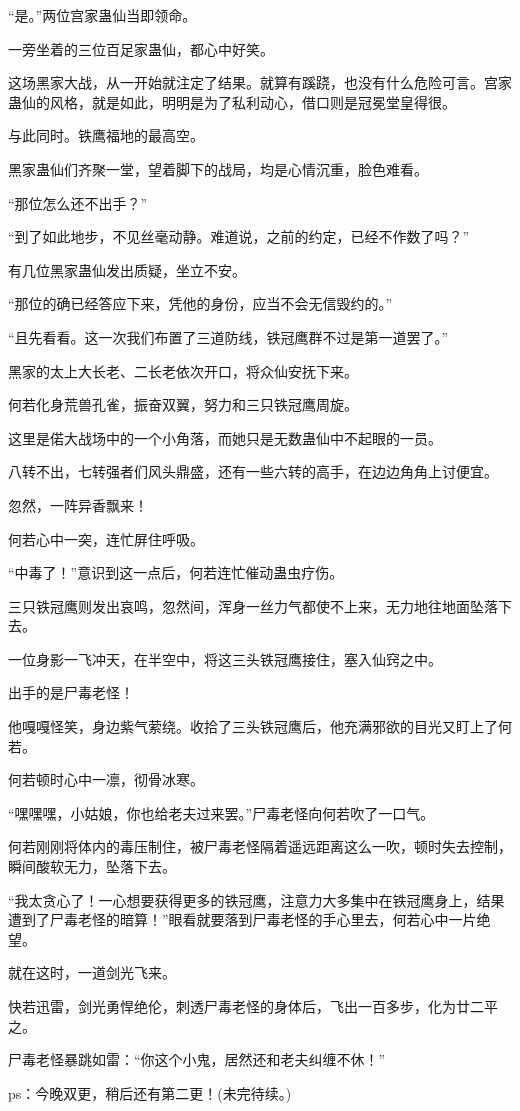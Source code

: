 \begin{this_body}
“是。”两位宫家蛊仙当即领命。

一旁坐着的三位百足家蛊仙，都心中好笑。

这场黑家大战，从一开始就注定了结果。就算有蹊跷，也没有什么危险可言。宫家蛊仙的风格，就是如此，明明是为了私利动心，借口则是冠冕堂皇得很。

与此同时。铁鹰福地的最高空。

黑家蛊仙们齐聚一堂，望着脚下的战局，均是心情沉重，脸色难看。

“那位怎么还不出手？”

“到了如此地步，不见丝毫动静。难道说，之前的约定，已经不作数了吗？”

有几位黑家蛊仙发出质疑，坐立不安。

“那位的确已经答应下来，凭他的身份，应当不会无信毁约的。”

“且先看看。这一次我们布置了三道防线，铁冠鹰群不过是第一道罢了。”

黑家的太上大长老、二长老依次开口，将众仙安抚下来。

何若化身荒兽孔雀，振奋双翼，努力和三只铁冠鹰周旋。

这里是偌大战场中的一个小角落，而她只是无数蛊仙中不起眼的一员。

八转不出，七转强者们风头鼎盛，还有一些六转的高手，在边边角角上讨便宜。

忽然，一阵异香飘来！

何若心中一突，连忙屏住呼吸。

“中毒了！”意识到这一点后，何若连忙催动蛊虫疗伤。

三只铁冠鹰则发出哀鸣，忽然间，浑身一丝力气都使不上来，无力地往地面坠落下去。

一位身影一飞冲天，在半空中，将这三头铁冠鹰接住，塞入仙窍之中。

出手的是尸毒老怪！

他嘎嘎怪笑，身边紫气萦绕。收拾了三头铁冠鹰后，他充满邪欲的目光又盯上了何若。

何若顿时心中一凛，彻骨冰寒。

“嘿嘿嘿，小姑娘，你也给老夫过来罢。”尸毒老怪向何若吹了一口气。

何若刚刚将体内的毒压制住，被尸毒老怪隔着遥远距离这么一吹，顿时失去控制，瞬间酸软无力，坠落下去。

“我太贪心了！一心想要获得更多的铁冠鹰，注意力大多集中在铁冠鹰身上，结果遭到了尸毒老怪的暗算！”眼看就要落到尸毒老怪的手心里去，何若心中一片绝望。

就在这时，一道剑光飞来。

快若迅雷，剑光勇悍绝伦，刺透尸毒老怪的身体后，飞出一百多步，化为廿二平之。

尸毒老怪暴跳如雷：“你这个小鬼，居然还和老夫纠缠不休！”

ps：今晚双更，稍后还有第二更！(未完待续。)

\end{this_body}


